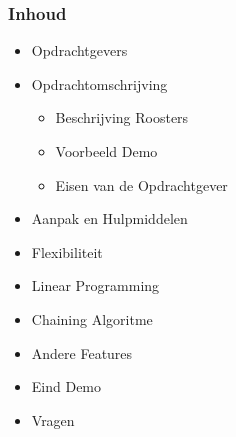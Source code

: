 \begin{frame}\frametitle{Inhoud}
    \begin{itemize}
        \item Opdrachtgevers
        \item Opdrachtomschrijving
        \begin{itemize}
        	\item Beschrijving Roosters
        	\item Voorbeeld Demo
        	\item Eisen van de Opdrachtgever
        \end{itemize}
        \item Aanpak en Hulpmiddelen
        \item Flexibiliteit
        \item Linear Programming
        \item Chaining Algoritme
        \item Andere Features
        \item Eind Demo
        \item Vragen
    \end{itemize}
\end{frame}
